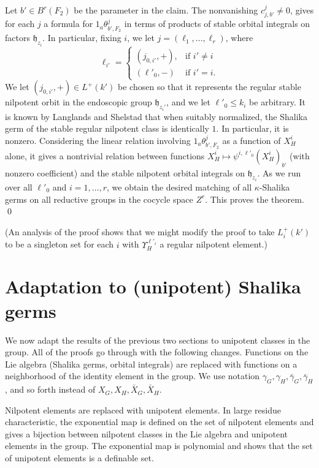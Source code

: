 \documentclass[12pt]{amsart}
\def\Y{\Upsilon}
\newcommand{\fh}{\mathfrak{h}}
\theoremstyle{plain}
\theoremstyle{definition}
\begin{document}
Let $b'\in B^r(F_2)$ be the parameter in the claim.  The
nonvanishing $c^j_{j,b'}\ne 0$, gives for each $j$ a formula for
$1_a\theta^j_{b',F_2}$ in terms of products of stable orbital integrals on
factors $\fh_{z_i}$.  In particular, fixing $i$, we let
$j = (\ell_1,\ldots,\ell_r)$, where 
\[
\ell_{i'} = \begin{cases} (j_{0,i'},+), &\text{if } i'\ne i\\
       (\ell'_0,-) & \text{if } i' = i.
  \end{cases}
\]
We let $(j_{0,i'},+)\in L^+(k')$ be chosen so that it represents the
regular stable nilpotent orbit in the endoscopic group
$\fh_{z_i'}$, and we let $\ell'_0\le k_{i}$ be arbitrary.  It is
known by Langlands and Shelstad that when suitably normalized, the
Shalika germ of the stable regular nilpotent class is identically $1$.
In particular, it is nonzero.  Considering the linear relation
involving $1_a\theta^j_{b',F_2}$ as a function of $X_H^i$ alone, it
gives a nontrivial relation between functions
$X_H^i\mapsto\psi^{i,\ell'_0}(X_H^i)_{b'}$ (with nonzero
coefficient) and the stable nilpotent orbital integrals on
$\fh_{z_i}$. As we run over all $\ell'_0$ and $i=1,\ldots,r$, we
obtain the desired matching of all $\kappa$-Shalika germs on all
reductive groups in the cocycle space $Z^r$.  This proves the theorem.
\qed

(An analysis of the proof shows that we might modify the proof to take
$L^+_i(k')$ to be a singleton set for each $i$ with $\Y_H^{\ell'_i}$
a regular nilpotent element.)

\section{Adaptation to (unipotent) Shalika germs}

We now adapt the results of the previous two sections to unipotent
classes in the group. All of the proofs go through with the following
changes.  Functions on the Lie algebra (Shalika germs, orbital
integrals) are replaced with functions on a neighborhood of the
identity element in the group.  We use notation
$\gamma_G,\gamma_H,\bar \gamma_G,\bar \gamma_H$, and so forth instead
of $X_G,X_H,\bar X_G,\bar X_H$.

Nilpotent elements are replaced with unipotent elements.  In large
residue characteristic,
the exponential map is defined on the set of nilpotent elements and
gives a bijection between nilpotent classes in the Lie algebra and
unipotent elements in the group.  The exponential map is polynomial
and shows that the set of unipotent elements is a definable set.
\end{document}
